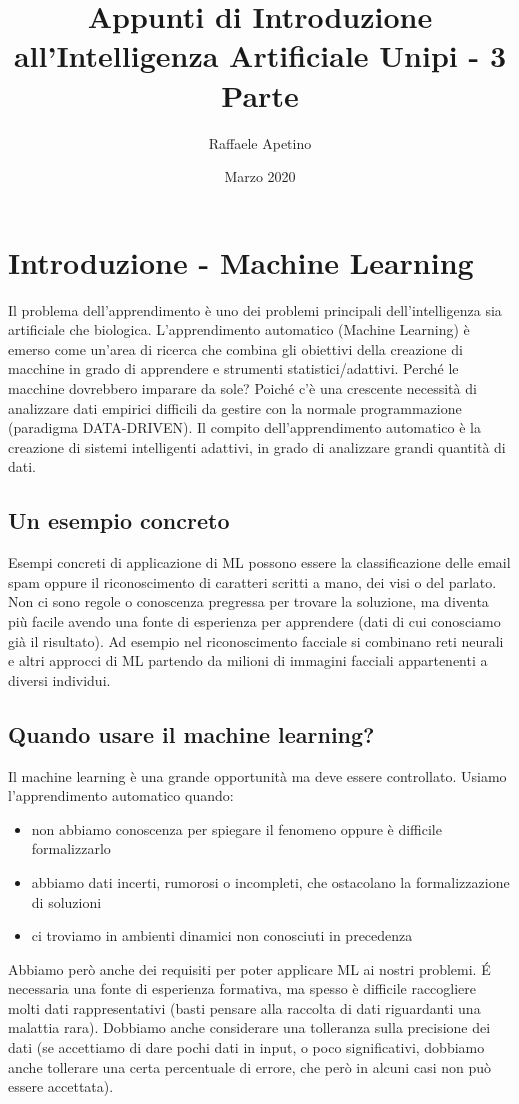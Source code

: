 \documentclass{article}
\title{Appunti di Introduzione all'Intelligenza Artificiale Unipi - 3 Parte}
\author{Raffaele Apetino}
\date{Marzo 2020}
\begin{document}
\maketitle

\tableofcontents{}
\clearpage

\section{Introduzione - Machine Learning}
Il problema dell'apprendimento è uno dei problemi principali dell'intelligenza sia artificiale che biologica. L'apprendimento automatico (Machine Learning) è emerso come un'area di ricerca che combina gli obiettivi della creazione di macchine in grado di apprendere e strumenti statistici/adattivi. Perché le macchine dovrebbero imparare da sole? Poiché c'è una crescente necessità di analizzare dati empirici difficili da gestire con la normale programmazione (paradigma DATA-DRIVEN). Il compito dell'apprendimento automatico è la creazione di sistemi intelligenti adattivi, in grado di analizzare grandi quantità di dati.

\subsection{Un esempio concreto}
Esempi concreti di applicazione di ML possono essere la classificazione delle email spam oppure il riconoscimento di caratteri scritti a mano, dei visi o del parlato. Non ci sono regole o conoscenza pregressa per trovare la soluzione, ma diventa più facile avendo una fonte di esperienza per apprendere (dati di cui conosciamo già il risultato). Ad esempio nel riconoscimento facciale si combinano reti neurali e altri approcci di ML partendo da milioni di immagini facciali appartenenti a diversi individui. 

\subsection{Quando usare il machine learning?}
Il machine learning è una grande opportunità ma deve essere controllato. Usiamo l'apprendimento automatico quando:
\begin{itemize}
    \item non abbiamo conoscenza per spiegare il fenomeno oppure è difficile formalizzarlo
    \item abbiamo dati incerti, rumorosi o incompleti, che ostacolano la formalizzazione di soluzioni
    \item ci troviamo in ambienti dinamici non conosciuti in precedenza
\end{itemize}
Abbiamo però anche dei requisiti per poter applicare ML ai nostri problemi. É necessaria una fonte di esperienza formativa, ma spesso è difficile raccogliere molti dati rappresentativi (basti pensare alla raccolta di dati riguardanti una malattia rara). Dobbiamo anche considerare una tolleranza sulla precisione dei dati (se accettiamo di dare pochi dati in input, o poco significativi, dobbiamo anche tollerare una certa percentuale di errore, che però in alcuni casi non può essere accettata).
\end{document}
